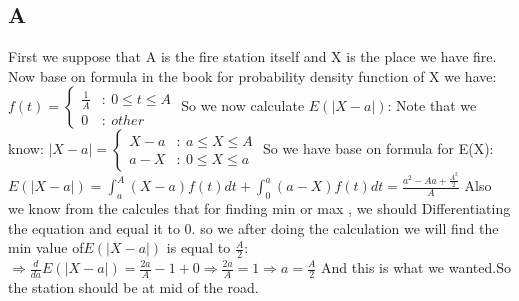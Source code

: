 \documentclass[12pt]{article}
\begin{document}
\subsection*{A}
First we suppose that A is the fire station itself and X is the place we have
fire. \newline Now base on formula in the book for probability density function
of X we have: \newline \newline $f(t)= \left\{ \begin{array}{cl}
        \frac{1}{A} & : \ 0\le t\le A \\
        0           & : \ other
    \end{array} \right.$
\newline \newline So we now calculate $E(|X-a|)$:
\newline Note that we know:
\newline \newline $|X-a| = \left\{ \begin{array}{cl}
        X-a & : \ a\le X\le A \\
        a-X & : \ 0\le X\le a
    \end{array} \right.$
\newline \newline So we have base on formula for E(X):
\newline \newline $E(|X-a|)=\int_{a}^{A} (X-a)f(t)dt +\int_{0}^{a} (a-X)f(t)dt=\frac{a^{2}-Aa+\frac{A^{2}}{2}}{A}$
\newline \newline Also we know from the calcules that for finding min or max , we should Differentiating the equation and equal it to $0$.
so we after doing the calculation we will find the min value of$E(|X-a|)$ is equal to $\frac{A}{2}$:
\newline \newline $\Rightarrow \frac{d }{da}E(|X-a|)=\frac{2a}{A}-1+0 \Rightarrow \frac{2a}{A}=1 \Rightarrow a=\frac{A}{2}$
\newline\newline And this is what we wanted.So the station should be at mid of the road.
\newline
\end{document}
